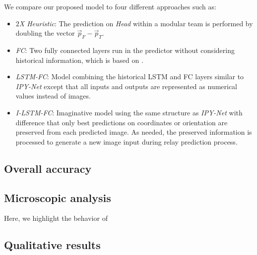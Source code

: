 \documentclass[letterpaper, 10 pt, conference]{ieeeconf}  %
\begin{document}
	We compare our proposed model to four different approaches such as: 
	\begin{itemize}
		\item \emph{$2$X Heuristic}: 
		The prediction on \emph{Head} within a modular team is performed by doubling the vector 
		$\vec{p}_{F} - \vec{p}_{T}$.
		
		\item \emph{FC}: 
		Two fully connected layers run in the predictor without considering historical 
		information, which is based on \cite{Choi17}.  
				
		\item \emph{LSTM-FC}: 
		Model combining the historical LSTM and FC layers similar to \emph{IPY-Net} except that 
		all inputs and outputs are represented as numerical values instead of images. 
		
		\item \emph{I-LSTM-FC}: 
		Imaginative model using the same structure as \emph{IPY-Net} with difference that 
		only best predictions on coordinates or orientation are preserved from each predicted image. 
		As needed, the preserved information is processed to generate a new image input during 
		relay prediction process.
	\end{itemize}	

	
	
	
	\subsection{Overall accuracy}
	\label{sec:overall_performance}
	
	
	\subsection{Microscopic analysis}
	\label{sec:microscopic_analysis}
	
	Here, we highlight the behavior of 
	
	
	\subsection{Qualitative results} 
	\label{sec:qualitative_results} 
\end{document}
